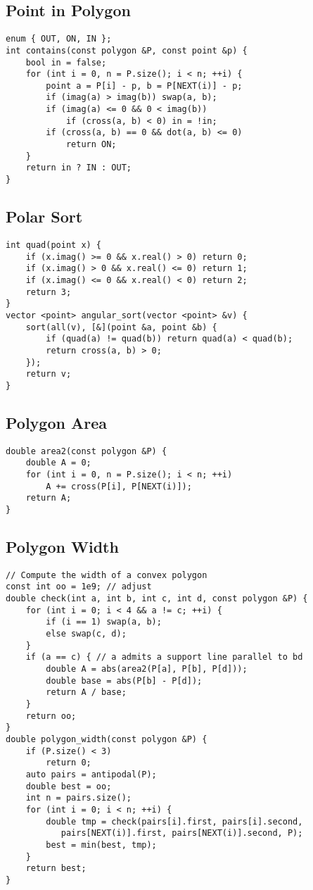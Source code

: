 \documentclass[landscape, 8pt, a4paper, oneside]{extarticle}
\begin{document}
\begin{multicols}{3}
\subsection{Point in Polygon}
\begin{verbatim}
enum { OUT, ON, IN };
int contains(const polygon &P, const point &p) {
    bool in = false;
    for (int i = 0, n = P.size(); i < n; ++i) {
        point a = P[i] - p, b = P[NEXT(i)] - p;
        if (imag(a) > imag(b)) swap(a, b);
        if (imag(a) <= 0 && 0 < imag(b))
            if (cross(a, b) < 0) in = !in;
        if (cross(a, b) == 0 && dot(a, b) <= 0)
            return ON;
    }
    return in ? IN : OUT;
}   
\end{verbatim}
\subsection{Polar Sort}
\begin{verbatim}
int quad(point x) {
    if (x.imag() >= 0 && x.real() > 0) return 0;
    if (x.imag() > 0 && x.real() <= 0) return 1;
    if (x.imag() <= 0 && x.real() < 0) return 2;
    return 3;
}
vector <point> angular_sort(vector <point> &v) {
    sort(all(v), [&](point &a, point &b) {
        if (quad(a) != quad(b)) return quad(a) < quad(b);
        return cross(a, b) > 0;
    });
    return v;
}
\end{verbatim}
\subsection{Polygon Area}
\begin{verbatim}
double area2(const polygon &P) {
    double A = 0;
    for (int i = 0, n = P.size(); i < n; ++i)
        A += cross(P[i], P[NEXT(i)]);
    return A;
}
\end{verbatim}
\subsection{Polygon Width}
\begin{verbatim}
// Compute the width of a convex polygon
const int oo = 1e9; // adjust
double check(int a, int b, int c, int d, const polygon &P) {
    for (int i = 0; i < 4 && a != c; ++i) {
        if (i == 1) swap(a, b);
        else swap(c, d);
    }
    if (a == c) { // a admits a support line parallel to bd
        double A = abs(area2(P[a], P[b], P[d]));
        double base = abs(P[b] - P[d]);
        return A / base;
    }
    return oo;
}
double polygon_width(const polygon &P) {
    if (P.size() < 3)
        return 0;
    auto pairs = antipodal(P);
    double best = oo;
    int n = pairs.size();
    for (int i = 0; i < n; ++i) {
        double tmp = check(pairs[i].first, pairs[i].second,
           pairs[NEXT(i)].first, pairs[NEXT(i)].second, P);
        best = min(best, tmp);
    }
    return best;
}    
\end{verbatim}

\end{multicols}
\end{document}

